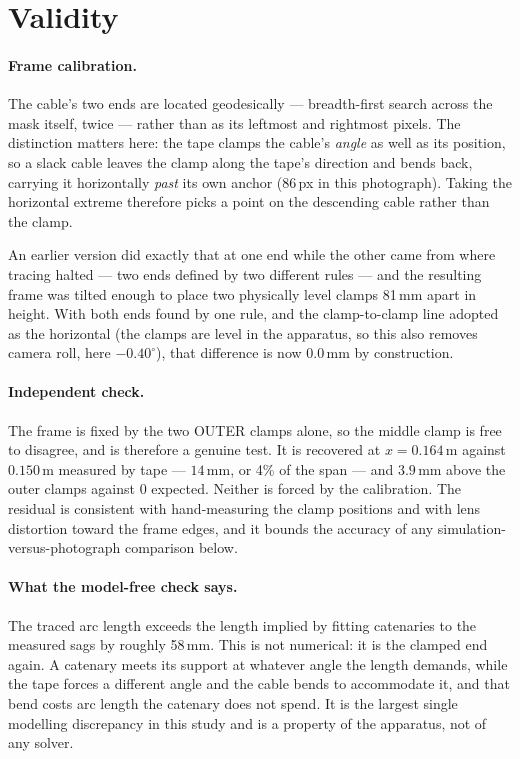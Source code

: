\documentclass[11pt,a4paper]{article}
\begin{document}
\section{Validity}
\label{sec:validity}

\paragraph{Frame calibration.} The cable's two ends are located
geodesically --- breadth-first search across the mask itself, twice --- rather
than as its leftmost and rightmost pixels. The distinction matters here: the
tape clamps the cable's \emph{angle} as well as its position, so a slack
cable leaves the clamp along the tape's direction and bends back, carrying it
horizontally \emph{past} its own anchor (86\,px in this photograph). Taking
the horizontal extreme therefore picks a point on the descending cable rather
than the clamp.

An earlier version did exactly that at one end while the other came from where
tracing halted --- two ends defined by two different rules --- and the
resulting frame was tilted enough to place two physically level clamps 81\,mm
apart in height. With both ends found by one rule, and the clamp-to-clamp line
adopted as the horizontal (the clamps are level in the apparatus, so this also
removes camera roll, here $-0.40^\circ$), that difference is now $0.0$\,mm by
construction.

\paragraph{Independent check.} The frame is fixed by the two OUTER clamps
alone, so the middle clamp is free to disagree, and is therefore a genuine
test. It is recovered at $x = 0.164$\,m against $0.150$\,m measured by tape ---
$14$\,mm, or 4\% of the span --- and $3.9$\,mm above the outer clamps against
$0$ expected. Neither is forced by the calibration. The residual is consistent
with hand-measuring the clamp positions and with lens distortion toward the
frame edges, and it bounds the accuracy of any
simulation-versus-photograph comparison below.

\paragraph{What the model-free check says.} The traced arc length exceeds the
length implied by fitting catenaries to the measured sags by roughly 58\,mm.
This is not numerical: it is the clamped end again. A catenary meets its
support at whatever angle the length demands, while the tape forces a
different angle and the cable bends to accommodate it, and that bend costs arc
length the catenary does not spend. It is the largest single modelling
discrepancy in this study and is a property of the apparatus, not of any
solver.
\end{document}
